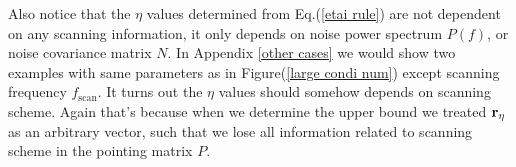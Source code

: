 \documentclass[twocolumn,linenumbers]{aastex631}
\newcommand{\vbd}{\vb{d}}
\newcommand{\hatm}{\vb{\hat{m}}}
\newcommand{\Nbar}{\bar{N}}
\begin{document}
Also notice that the $\eta$ values determined from Eq.(\ref{etai rule})
are not dependent on any scanning information,
it only depends on noise power spectrum $P(f)$, or noise covariance matrix $N$.
In Appendix \ref{other cases} we would show 
two examples with same parameters as in Figure(\ref{large condi num}) except 
scanning frequency $f_{\text{scan}}$.%
It turns out the $\eta$ values should somehow depends
on scanning scheme.
Again that's because when we determine the upper bound%
we treated
$\vb{r}_{\eta}$ %
as an arbitrary vector, such that we lose all information related to scanning 
scheme in the pointing matrix $P$.


%
\end{document}
